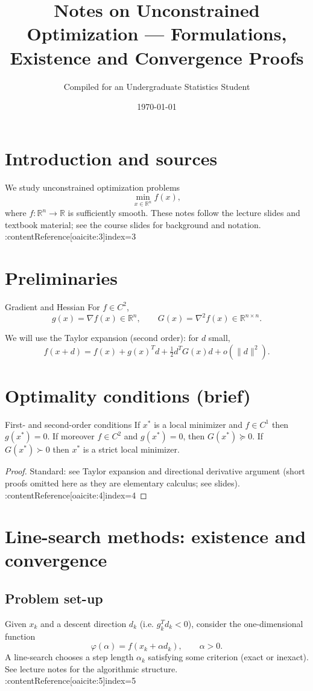 \documentclass{MathNote}
\title{Notes on Unconstrained Optimization — Formulations, Existence and Convergence Proofs}
\author{Compiled for an Undergraduate Statistics Student}
\date{\today}
\begin{document}
\maketitle

\section{Introduction and sources}
We study unconstrained optimization problems
\[
  \min_{x\in\mathbb{R}^n} f(x),
\]
where \(f:\mathbb{R}^n\to\mathbb{R}\) is sufficiently smooth. These notes follow the lecture slides and textbook material; see the course slides for background and notation. :contentReference[oaicite:3]{index=3}

\section{Preliminaries}
\begin{definition}{Gradient and Hessian}{}
For \(f\in C^2\),
\[
g(x)=\nabla f(x)\in\mathbb{R}^n,\qquad G(x)=\nabla^2 f(x)\in\mathbb{R}^{n\times n}.
\]
\end{definition}

We will use the Taylor expansion (second order): for \(d\) small,
\[
f(x+d)=f(x)+g(x)^T d+\tfrac12 d^T G(x) d + o(\|d\|^2).
\]

\section{Optimality conditions (brief)}
\begin{theorem}{First- and second-order conditions}{}
If \(x^*\) is a local minimizer and \(f\in C^1\) then \(g(x^*)=0\).
If moreover \(f\in C^2\) and \(g(x^*)=0\), then \(G(x^*)\succeq 0\). If \(G(x^*)\succ0\) then \(x^*\) is a strict local minimizer.
\end{theorem}
\begin{proof}
Standard: see Taylor expansion and directional derivative argument (short proofs omitted here as they are elementary calculus; see slides). :contentReference[oaicite:4]{index=4}
\end{proof}

\section{Line-search methods: existence and convergence}

\subsection{Problem set-up}
Given \(x_k\) and a descent direction \(d_k\) (i.e. \(g_k^T d_k<0\)), consider the one-dimensional function
\[
\varphi(\alpha)=f(x_k+\alpha d_k),\qquad \alpha>0.
\]
A line-search chooses a step length \(\alpha_k\) satisfying some criterion (exact or inexact). See lecture notes for the algorithmic structure. :contentReference[oaicite:5]{index=5}
\end{document}
